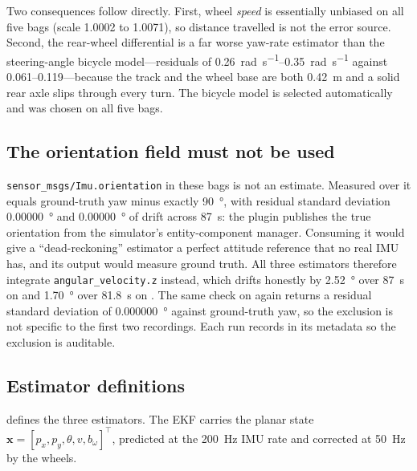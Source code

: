 Two consequences follow directly. First, wheel \emph{speed} is essentially
unbiased on all five bags (scale 1.0002 to 1.0071), so distance travelled is not
the error source. Second, the rear-wheel differential is a far worse yaw-rate estimator
than the steering-angle bicycle model---residuals of \SIrange{0.26}{0.35}{\radian\per\second}
against \numrange{0.061}{0.119}---because the track
and the wheel base are both \SI{0.42}{\metre} and a solid rear axle slips through
every turn. The bicycle model is selected automatically and was chosen on all five
bags.

\subsection{The orientation field must not be used}

\texttt{sensor\_msgs/Imu.orientation} in these bags is not an estimate. Measured
over  it equals ground-truth yaw minus exactly
\SI{90}{\degree}, with residual standard deviation \SI{0.00000}{\degree} and
\SI{0.00000}{\degree} of drift across \SI{87}{\second}: the plugin publishes the
true orientation from the simulator's entity-component manager. Consuming it
would give a ``dead-reckoning'' estimator a perfect attitude reference that no
real IMU has, and its output would measure ground truth. All three estimators
therefore integrate \texttt{angular\_velocity.z} instead, which drifts honestly by
\SI{2.52}{\degree} over \SI{87}{\second} on  and
\SI{1.70}{\degree} over \SI{81.8}{\second} on . The same check
on  again returns a residual standard deviation of
\SI{0.000000}{\degree} against ground-truth yaw, so the exclusion is not specific
to the first two recordings. Each run
records  in its metadata so the exclusion is
auditable.

\subsection{Estimator definitions}

 defines the three estimators. The EKF carries the
planar state $\mathbf{x}=[p_x,p_y,\theta,v,b_\omega]^{\top}$, predicted at the
\SI{200}{\hertz} IMU rate and corrected at \SI{50}{\hertz} by the wheels.

